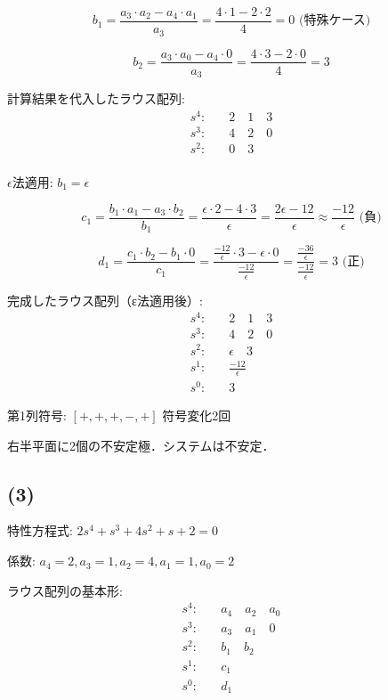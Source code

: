 \documentclass[11pt,a4paper]{ltjsarticle}
\begin{document}
$$b_1 = \frac{a_3 \cdot a_2 - a_4 \cdot a_1}{a_3} = \frac{4 \cdot 1 - 2 \cdot 2}{4} = 0 \text{ (特殊ケース)}$$

$$b_2 = \frac{a_3 \cdot a_0 - a_4 \cdot 0}{a_3} = \frac{4 \cdot 3 - 2 \cdot 0}{4} = 3$$

計算結果を代入したラウス配列:
\begin{align*}
s^4: & \quad 2 \quad 1 \quad 3 \\
s^3: & \quad 4 \quad 2 \quad 0 \\
s^2: & \quad 0 \quad 3 \\
\end{align*}

$\epsilon$法適用: $b_1 = \epsilon$

$$c_1 = \frac{b_1 \cdot a_1 - a_3 \cdot b_2}{b_1} = \frac{\epsilon \cdot 2 - 4 \cdot 3}{\epsilon} = \frac{2\epsilon - 12}{\epsilon} \approx \frac{-12}{\epsilon} \text{ (負)}$$

$$d_1 = \frac{c_1 \cdot b_2 - b_1 \cdot 0}{c_1} = \frac{\frac{-12}{\epsilon} \cdot 3 - \epsilon \cdot 0}{\frac{-12}{\epsilon}} = \frac{\frac{-36}{\epsilon}}{\frac{-12}{\epsilon}} = 3 \text{ (正)}$$

完成したラウス配列（ε法適用後）:
\begin{align*}
s^4: & \quad 2 \quad 1 \quad 3 \\
s^3: & \quad 4 \quad 2 \quad 0 \\
s^2: & \quad \epsilon \quad 3 \\
s^1: & \quad \frac{-12}{\epsilon} \\
s^0: & \quad 3
\end{align*}

第1列符号: $[+, +, +, -, +]$ 符号変化2回

右半平面に2個の不安定極．システムは不安定．

\subsection{(3)}
特性方程式: $2s^4+s^3+4s^2+s+2=0$

係数: $a_4=2, a_3=1, a_2=4, a_1=1, a_0=2$

ラウス配列の基本形:
\begin{align*}
s^4: & \quad a_4 \quad a_2 \quad a_0 \\
s^3: & \quad a_3 \quad a_1 \quad 0 \\
s^2: & \quad b_1 \quad b_2 \\
s^1: & \quad c_1 \\
s^0: & \quad d_1
\end{align*}
\end{document}
